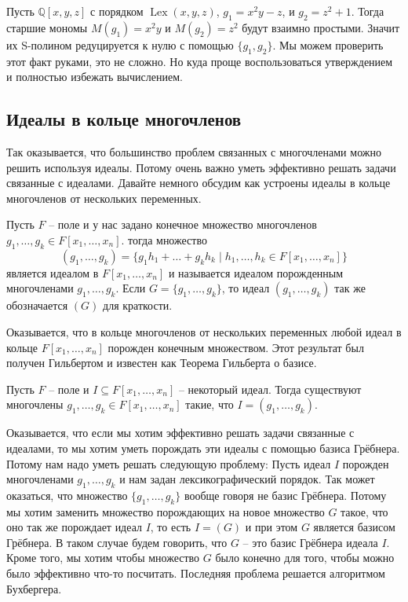 \begin{example}
Пусть $\mathbb Q[x, y, z]$ с порядком $\operatorname{Lex}(x, y, z)$, $g_1 = x^2 y - z$, и $g_2 = z^2 + 1$.
Тогда старшие мономы $M(g_1) = x^2 y$ и $M(g_2) = z^2$ будут взаимно простыми.
Значит их S-полином редуцируется к нулю с помощью $\{g_1,g_2\}$.
Мы можем проверить этот факт руками, это не сложно.
Но куда проще воспользоваться утверждением и полностью избежать вычислением.
\end{example}


\subsection{Идеалы в кольце многочленов}

Так оказывается, что большинство проблем связанных с многочленами можно решить используя идеалы.
Потому очень важно уметь эффективно решать задачи связанные с идеалами.
Давайте немного обсудим как устроены идеалы в кольце многочленов от нескольких переменных.

\begin{definition}
\label{def::FinGenIdeal}
Пусть $F$ -- поле и у нас задано конечное множество многочленов $g_1,\ldots,g_k\in F[x_1,\ldots,x_n]$.
тогда множество
\[
(g_1,\ldots,g_k) = \{g_1 h_1 + \ldots + g_k h_k\mid h_1,\ldots,h_k\in F[x_1,\ldots,x_n]\}
\]
является идеалом в $F[x_1,\ldots,x_n]$ и называется идеалом порожденным многочленами $g_1,\ldots,g_k$.
Если $G = \{g_1,\ldots,g_k\}$, то идеал $(g_1,\ldots,g_k)$ так же обозначается $(G)$ для краткости.
\end{definition}

Оказывается, что в кольце многочленов от нескольких переменных любой идеал в кольце $F[x_1,\ldots,x_n]$ порожден конечным множеством.
Этот результат был получен Гильбертом и известен как Теорема Гильберта о базисе.

\begin{claim}
\label{claim::HilbertBasisThm}
Пусть $F$ -- поле и $I\subseteq F[x_1,\ldots,x_n]$ -- некоторый идеал.
Тогда существуют многочлены $g_1,\ldots,g_k\in F[x_1,\ldots,x_n]$ такие, что $I = (g_1,\ldots,g_k)$.
\end{claim}

Оказывается, что если мы хотим эффективно решать задачи связанные с идеалами, то мы хотим уметь порождать эти идеалы с помощью базиса Грёбнера.
Потому нам надо уметь решать следующую проблему:
Пусть идеал $I$ порожден многочленами $g_1,\ldots,g_k$ и нам задан лексикографический порядок.
Так может оказаться, что множество $\{g_1,\ldots,g_k\}$ вообще говоря не базис Грёбнера.
Потому мы хотим заменить множество порождающих на новое множество $G$ такое, что оно так же порождает идеал $I$, то есть $I = (G)$ и при этом $G$ является базисом Грёбнера.
В таком случае будем говорить, что $G$ -- это базис Грёбнера идеала $I$.
Кроме того, мы хотим чтобы множество $G$ было конечно для того, чтобы можно было эффективно что-то посчитать.
Последняя проблема решается алгоритмом Бухбергера.

